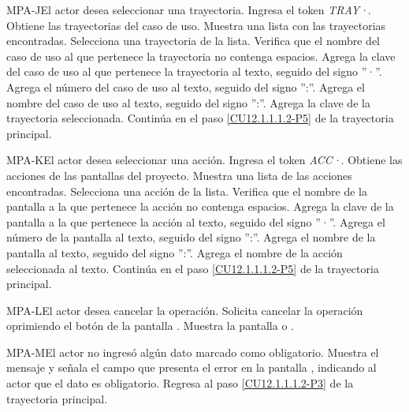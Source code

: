 	\begin{UCtrayectoriaA}{MPA-J}{El actor desea seleccionar una trayectoria.}
		\UCpaso[\UCactor] Ingresa el token {\em TRAY·}. 
		\UCpaso[\UCsist] Obtiene las trayectorias del caso de uso.
		\UCpaso[\UCsist] Muestra una lista con las trayectorias encontradas.
		\UCpaso[\UCactor] Selecciona una trayectoria de la lista.
		\UCpaso[\UCsist] Verifica que el nombre del caso de uso al que pertenece la trayectoria no contenga espacios. 
		\UCpaso[\UCsist] Agrega la clave del caso de uso al que pertenece la trayectoria al texto, seguido del signo ''·''.
		\UCpaso[\UCsist] Agrega el número del caso de uso al texto, seguido del signo '':''.
		\UCpaso[\UCsist] Agrega el nombre del caso de uso al texto, seguido del signo '':''.
		\UCpaso[\UCsist] Agrega la clave de la trayectoria seleccionada.
		\UCpaso Continúa en el paso \ref{CU12.1.1.1.2-P5} de la trayectoria principal.
	\end{UCtrayectoriaA}

	\begin{UCtrayectoriaA}{MPA-K}{El actor desea seleccionar una acción.}
		\UCpaso[\UCactor] Ingresa el token {\em ACC·}. 
		\UCpaso[\UCsist] Obtiene las acciones de las pantallas del proyecto.
		\UCpaso[\UCsist] Muestra una lista de las acciones encontradas.
		\UCpaso[\UCactor] Selecciona una acción de la lista.
		\UCpaso[\UCsist] Verifica que el nombre de la pantalla a la que pertenece la acción no contenga espacios. 
		\UCpaso[\UCsist] Agrega la clave de la pantalla a la que pertenece la acción al texto, seguido del signo ''·''.
		\UCpaso[\UCsist] Agrega el número de la pantalla al texto, seguido del signo '':''.
		\UCpaso[\UCsist] Agrega el nombre de la pantalla al texto, seguido del signo '':''.
		\UCpaso[\UCsist] Agrega el nombre de la acción seleccionada al texto.
		\UCpaso Continúa en el paso \ref{CU12.1.1.1.2-P5} de la trayectoria principal.
	\end{UCtrayectoriaA}

	\begin{UCtrayectoriaA}{MPA-L}{El actor desea cancelar la operación.}
		\UCpaso[\UCactor] Solicita cancelar la operación oprimiendo el botón  de la pantalla .
		\UCpaso[\UCsist] Muestra la pantalla  o .
	\end{UCtrayectoriaA}

	\begin{UCtrayectoriaA}{MPA-M}{El actor no ingresó algún dato marcado como obligatorio.}
		\UCpaso[\UCsist] Muestra el mensaje  y señala el campo que presenta el error en la pantalla , indicando al actor que el dato es obligatorio.
		\UCpaso Regresa al paso \ref{CU12.1.1.1.2-P3} de la trayectoria principal.
	\end{UCtrayectoriaA}

